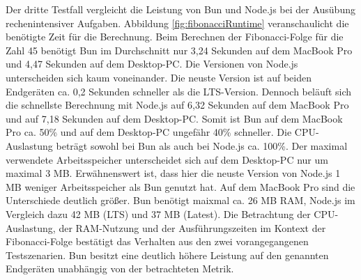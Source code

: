 \noindent
Der dritte Testfall vergleicht die Leistung von Bun und Node.js bei der Ausübung rechenintensiver Aufgaben. Abbildung \ref{fig:fibonacciRuntime} veranschaulicht die benötigte Zeit für die Berechnung. Beim Berechnen der Fibonacci-Folge für die Zahl 45 benötigt Bun im Durchschnitt nur 3,24 Sekunden auf dem MacBook Pro und 4,47 Sekunden auf dem Desktop-PC. Die Versionen von Node.js unterscheiden sich kaum voneinander. Die neuste Version ist auf beiden Endgeräten ca. 0,2 Sekunden schneller als die LTS-Version. Dennoch beläuft sich die schnellste Berechnung mit Node.js auf 6,32 Sekunden auf dem MacBook Pro und auf 7,18 Sekunden auf dem Desktop-PC. Somit ist Bun auf dem MacBook Pro ca. 50\% und auf dem Desktop-PC ungefähr 40\% schneller. Die CPU-Auslastung beträgt sowohl bei Bun als auch bei Node.js ca. 100\%. Der maximal verwendete Arbeitsspeicher unterscheidet sich auf dem Desktop-PC nur um maximal 3 MB. Erwähnenswert ist, dass hier die neuste Version von Node.js 1 MB weniger Arbeitsspeicher als Bun genutzt hat. Auf dem MacBook Pro sind die Unterschiede deutlich größer. Bun benötigt maixmal ca. 26 MB RAM, Node.js im Vergleich dazu 42 MB (LTS) und 37 MB (Latest).\newline
Die Betrachtung der CPU-Auslastung, der RAM-Nutzung und der Ausführungszeiten im Kontext der Fibonacci-Folge bestätigt das Verhalten aus den zwei vorangegangenen Testszenarien. Bun besitzt eine deutlich höhere Leistung auf den genannten Endgeräten unabhängig von der betrachteten Metrik.

